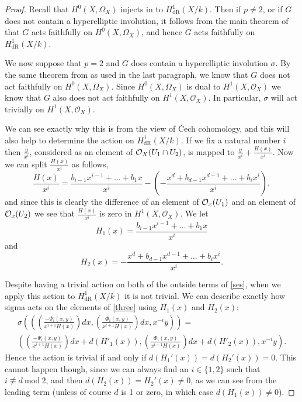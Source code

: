 \documentclass[draft, 11pt]{article} %
\theoremstyle{plain}
\theoremstyle{remark}
\newcommand{\cO}{{\cal O}}
\newcommand{\cech}{\v{C}ech }
\newcommand{\hzero}{{H^0(X,\Omega_X)}}
\newcommand{\hone}{H^1(X,\mathcal{O}_X)}
\newcommand{\derhamhone}{H_{\text {dR}}^1(X/k)}
\begin{document}
\begin{proof}
Recall that $H^0(X,\Omega_X)$ injects in to $\derhamhone$.
Then if $p \neq 2$, or if $G$ does not contain a hyperelliptic involution, it follows from the main theorem of \cite{faithfulaction} that $G$ acts faithfully on $H^0(X,\Omega_X)$, and hence $G$ acts faithfully on $\derhamhone$.

We now suppose that $p=2$ and $G$ does contain a hyperelliptic involution $\sigma$.
By the same theorem from \cite{faithfulaction} as used in the last paragraph, we know that $G$ does not act faithfully on $\hzero$.
Since $\hzero$ is dual to $\hone$ we know that $G$ also does not act faithfully on $\hone$.
In particular, $\sigma$ will act trivially on $\hone$.

We can see exactly why this is from the view of \cech cohomology, and this will also help to determine the action on $\derhamhone$.
If we fix a natural number $i$ then $\frac{y}{x^i}$, considered as an element of $\cO_X(U_1\cap U_2)$, is mapped to $\frac{y}{x^i} + \frac{H(x)}{x^i}$. 
Now we can split $\frac{H(x)}{x^i}$ as follows, 
\begin{equation*}
\frac{H(x)}{x^i} =  \frac{b_{i-1}x^{i-1} + \ldots + b_1x}{x^i} - \left( - \frac{x^d + b_{d-1}x^{d-1} + \ldots + b_ix^i}{x^i} \right),
\end{equation*}
and since this is clearly the difference of an element of $\cO_x(U_1)$ and an element of $\cO_x(U_2)$ we see that $\frac{H(x)}{x^i}$ is zero in $\hone$.
We let 
\[
H_1(x) = \frac{b_{i-1}x^{i-1} + \ldots + b_1x}{x^i}
\]
and 
\[
H_2(x) = - \frac{x^d + b_{d-1}x^{d-1} + \ldots + b_ix^i}{x^i}.
\]

Despite having a trivial action on both of the outside terms of \eqref{ses}, when we apply this action to $\derhamhone$ it is not trivial. 
We can describe exactly how sigma acts on the elements of \eqref{three} using $H_1(x)$ and $H_2(x)$:
\begin{multline}
\sigma \left( \left( \left(\frac{-\Psi_i(x,y)}{x^{i+1}H(x)}\right) dx, \left( \frac{\Phi_i(x,y)}{x^{i+1}H(x)} \right) dx, x^{-i}y \right)\right) = \\
 \left( \left(\frac{-\Psi_i(x,y)}{x^{i+1}H(x)} \right) dx + d\left(H'_1(x)\right),  \left( \frac{\Phi_i(x,y)}{x^{i+1}H(x)} \right) dx+ d\left(H'_2(x)\right) , x^{-i}y \right).
\end{multline}
Hence the action is trivial if and only if $d\left(H_1'(x)\right) = d\left(H_2'(x)\right) =0$.
This cannot happen though, since we can always find an $i\in \{1,2\}$ such that $i \not\equiv d\ \text{mod}\ 2$, and then $d\left(H_2(x)\right) = H_2'(x) \neq 0$, as we can see from the leading term (unless of course $d$ is 1 or zero, in which case $d\left(H_1(x)\right) \neq 0$).
\end{proof}
\end{document}
